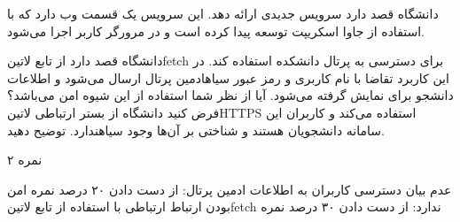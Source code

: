 \documentclass[../main.tex]{subfiles}
\begin{document}

دانشگاه قصد دارد سرویس جدیدی ارائه دهد.
این سرویس یک قسمت وب دارد که با استفاده از جاوا اسکریپت توسعه پیدا
کرده است و در مرورگر کاربر اجرا می‌شود.

دانشگاه قصد دارد از تابع ‌لاتین{fetch} برای دسترسی به پرتال دانشکده استفاده کند.
در این کاربرد تقاضا با نام کاربری و رمز عبور ‌سیاه{ادمین} پرتال ارسال می‌شود و اطلاعات دانشجو برای نمایش گرفته می‌شود.
آیا از نظر شما استفاده از این شیوه امن می‌باشد؟ فرض کنید دانشگاه از بستر ارتباطی ‌لاتین{HTTPS} استفاده می‌کند و
کاربران این سامانه دانشجویان هستند و شناختی بر آن‌ها وجود ‌سیاه{ندارد}.
توضیح دهید.

۲ نمره

 عدم بیان دسترسی کاربران به اطلاعات ادمین پرتال: از دست دادن ۲۰ درصد نمره
 امن بودن ارتباط ارتباطی با استفاده از تابع ‌لاتین{fetch} ندارد: از دست دادن ۳۰ درصد نمره
\end{document}
